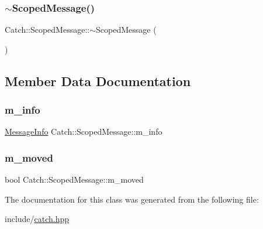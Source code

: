 \mbox{\label{class_catch_1_1_scoped_message_a43190843f9eeb84a0b42b0bc95fdf93a}} 
\subsubsection{\texorpdfstring{$\sim$ScopedMessage()}{~ScopedMessage()}}
{\footnotesize\ttfamily Catch\+::\+Scoped\+Message\+::$\sim$\+Scoped\+Message (\begin{DoxyParamCaption}{ }\end{DoxyParamCaption})}



\subsection{Member Data Documentation}
\mbox{\label{class_catch_1_1_scoped_message_ae6e1476f389cc6e1586f033b3747b27b}} 
\subsubsection{\texorpdfstring{m\_info}{m\_info}}
{\footnotesize\ttfamily \mbox{\hyperlink{struct_catch_1_1_message_info}{Message\+Info}} Catch\+::\+Scoped\+Message\+::m\+\_\+info}

\mbox{\label{class_catch_1_1_scoped_message_a4fe5607c1f7407240a0da8405b1c12e7}} 
\subsubsection{\texorpdfstring{m\_moved}{m\_moved}}
{\footnotesize\ttfamily bool Catch\+::\+Scoped\+Message\+::m\+\_\+moved}



The documentation for this class was generated from the following file\+:\begin{DoxyCompactItemize}
\item 
include/\mbox{\hyperlink{catch_8hpp}{catch.\+hpp}}\end{DoxyCompactItemize}

